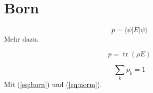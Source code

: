 \section{Born}\label{sec:born}
\begin{equation}p=\langle\psi|E|\psi\rangle\label{eq:born}\end{equation}
Mehr dazu.
\begin{tiefe}\begin{tiefeinner}
\begin{equation}p=\operatorname{tr}(\rho E)\label{eq:born-tief}\end{equation}
\end{tiefeinner}\end{tiefe}
\begin{equation}\sum_k p_k=1\label{eq:norm}\end{equation}
Mit (\ref{eq:born}) und (\ref{eq:norm}).
